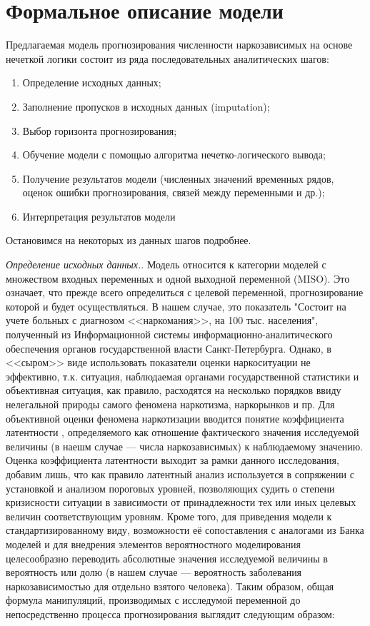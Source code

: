 \newpage
\section{Формальное описание модели}
Предлагаемая модель прогнозирования численности наркозависимых на основе
нечеткой логики состоит из ряда последовательных аналитических шагов:
\begin{enumerate}
    \item Определение исходных данных;
    \item Заполнение пропусков в исходных данных (imputation);
    \item Выбор горизонта прогнозирования;
    \item Обучение модели с помощью алгоритма нечетко-логического вывода;
    \item Получение результатов модели (численных значений временных рядов,
        оценок ошибки прогнозирования, связей между переменными и др.);
    \item Интерпретация результатов модели 
\end{enumerate}
Остановимся на некоторых из данных шагов подробнее. 

\textit{Определение исходных данных.}. Модель относится к категории моделей с
множеством входных переменных и одной выходной переменной (MISO). Это означает,
что прежде всего определиться с целевой переменной, прогнозирование которой и
будет осуществляться. В нашем случае, это показатель "Состоит на учете больных с
диагнозом <<наркомания>>, на 100 тыс. населения", полученный из Информационной
системы информационно-аналитического обеспечения органов государственной власти
Санкт-Петербурга. Однако, в <<сыром>> виде использовать показатели оценки
наркоситуации не эффективно, т.к. ситуация, наблюдаемая органами государственной
статистики и объективная ситуация, как правило, расходятся на несколько порядков
ввиду нелегальной природы самого феномена наркотизма, наркорынков и пр. Для
объективной оценки феномена наркотизации вводится понятие коэффициента
латентности \cite{Zakharov2012}, определяемого как отношение фактического значения исследуемой
величины (в наешм случае --- числа наркозависимых) к наблюдаемому значению.
Оценка коэффициента латентности выходит за рамки данного исследования, добавим
лишь, что как правило латентный анализ используется  в сопряжении с установкой и
анализом пороговых уровней, позволяющих судить о степени кризисности ситуации в
зависимости от принадлежности тех или иных целевых величин соответствующим
уровням. Кроме того, для приведения модели к стандартизированному виду,
возможности её сопоставления с аналогами из Банка моделей и для внедрения
элементов вероятностного моделирования целесообразно переводить абсолютные
значения исследуемой величины в вероятность или долю (в нашем случае ---
вероятность заболевания наркозависимостью для отдельно взятого человека). Таким
образом, общая формула манипуляций, производимых с исследумой переменной до
непосредственно процесса прогнозирования выглядит следующим образом:

